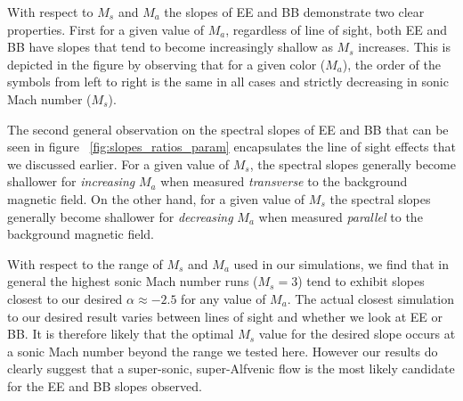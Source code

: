 With respect to $M_s$ and $M_a$ the slopes of EE and BB demonstrate two clear
properties. First for a given value of $M_a$, regardless of line of sight, both EE and BB have slopes that tend to become increasingly shallow as $M_s$ increases. This is
depicted in the figure by observing that for a given color ($M_a$), the order of
the symbols from left to right is the same in all cases and strictly decreasing
in sonic Mach number ($M_s$).

The second general observation on the spectral slopes of EE and BB that can be
seen in figure ~\ref{fig:slopes_ratios_param} encapsulates the line of sight
effects that we discussed earlier. For a given value of $M_s$, the spectral
slopes generally become shallower for \emph{increasing} $M_a$ when
measured \emph{transverse} to the background magnetic field. On the other hand,
for a given value of $M_s$ the spectral slopes generally become shallower for
\emph{decreasing} $M_a$ when measured \emph{parallel} to the background magnetic field.

With respect to the range of $M_s$ and $M_a$ used in our simulations, we find
that in general the highest sonic Mach number runs ($M_s=3$) tend to exhibit
slopes closest to our desired $\alpha\approx-2.5$ for any value of $M_a$. The
actual closest simulation to our desired result varies between lines of sight
and whether we look at EE or BB. It is therefore likely that the optimal $M_s$ value for the
desired slope occurs at a sonic Mach number beyond the range we tested here.
However our results do clearly suggest that a super-sonic, super-Alfvenic flow
is the most likely candidate for the EE and BB slopes observed. 


